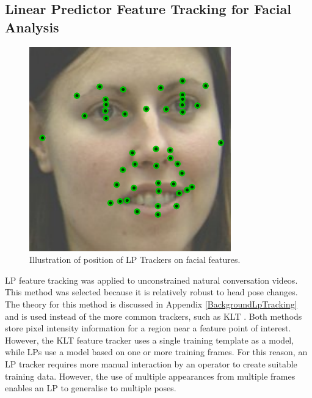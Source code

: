 

\subsection{Linear Predictor Feature Tracking for Facial Analysis}
\label{SectionLpTracking}

\begin{figure}
\centering
\includegraphics[width = 0.6 \columnwidth]{nvcclass/TrackerPositions.pdf}
\caption{Illustration of position of LP Trackers on facial features.}
\label{FigureTrackerPositions}
\end{figure}

\ac{LP} feature tracking \cite{Ong2009} was applied to unconstrained natural conversation videos. This method was selected because it is relatively robust to head pose changes. The theory for this method is discussed in Appendix \ref{BackgroundLpTracking} and is used instead of the more common trackers, such as \ac{KLT} \cite{Tomasi1991}. Both methods store pixel intensity information for a region near a feature point of interest. However, the \ac{KLT} feature tracker uses a single training template as a model, while \ac{LP}s use a model based on one or more training frames. For this reason, an  \ac{LP} tracker requires more manual interaction by an operator to create suitable training data. However, the use of multiple appearances from multiple frames enables an \ac{LP} to generalise to multiple poses. 

